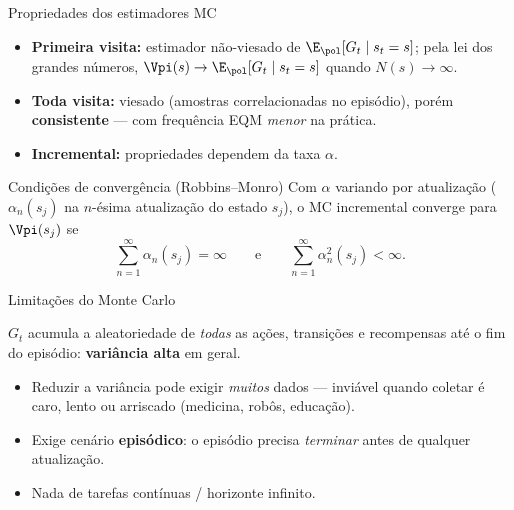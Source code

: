 \documentclass[aspectratio=169, 11pt]{beamer}
\begin{document}
\begin{frame}{Propriedades dos estimadores MC}
  \begin{itemize}
    \item \textbf{Primeira visita:} estimador \alert{não-viesado} de
      $\E_{\pol}[G_t \mid s_t = s]$; pela lei dos grandes números,
      $\Vpi(s) \to \E_{\pol}[G_t \mid s_t = s]$ quando $N(s) \to \infty$.
    \item \textbf{Toda visita:} \alert{viesado} (amostras correlacionadas
      no episódio), porém \textbf{consistente} — com frequência EQM
      \emph{menor} na prática.
    \item \textbf{Incremental:} propriedades dependem da taxa $\alpha$.
  \end{itemize}

  \begin{teobox}{Condições de convergência (Robbins–Monro)}
    Com $\alpha$ variando por atualização
    ($\alpha_n(s_j)$ na $n$-ésima atualização do estado $s_j$),
    o MC incremental converge para $\Vpi(s_j)$ se
    \[
      \sum_{n=1}^{\infty} \alpha_n(s_j) = \infty
      \qquad \text{e} \qquad
      \sum_{n=1}^{\infty} \alpha_n^2(s_j) < \infty.
    \]
  \end{teobox}
\end{frame}

\begin{frame}{Limitações do Monte Carlo}
  \begin{alertabox}
    $G_t$ acumula a aleatoriedade de \emph{todas} as ações, transições e
    recompensas até o fim do episódio: \textbf{variância alta} em geral.
  \end{alertabox}

  \begin{itemize}
    \item Reduzir a variância pode exigir \emph{muitos} dados — inviável
      quando coletar é caro, lento ou arriscado (medicina, robôs, educação).
    \item Exige cenário \textbf{episódico}: o episódio precisa
      \emph{terminar} antes de qualquer atualização.
    \item Nada de tarefas contínuas / horizonte infinito.
  \end{itemize}
\end{frame}
\end{document}

